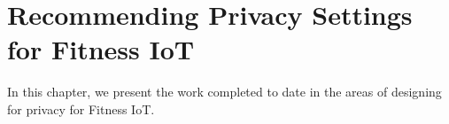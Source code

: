 \chapter{Recommending Privacy Settings for Fitness IoT}\label{chapter:fitnessIoT}
In this chapter, we present the work completed to date in the areas of designing for privacy for Fitness IoT.